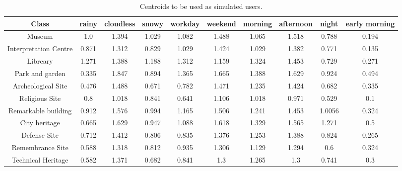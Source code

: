 \begin{table}[h!]
\centering
\caption{Centroids to be used as simulated users.}
\label{table:relevances-experiment}
\begin{tabular}{ |c|c|c|c|c|c|c|c|c|c| } 
    \hline
    \textbf{Class} & \textbf{rainy} & \textbf{cloudless} & \textbf{snowy} & \textbf{workday} & \textbf{weekend} & \textbf{morning} & \textbf{afternoon} & \textbf{night} & \textbf{early morning} \\
    \hline
    \hline

    Museum & 1.0 & 1.394 & 1.029 & 1.082 & 1.488 & 1.065 & 1.518 & 0.788 & 0.194 \\ \hline
    
    Interpretation Centre & 0.871 & 1.312 & 0.829 & 1.029 & 1.424 & 1.029  & 1.382 & 0.771 & 0.135 \\ \hline

    Libreary & 1.271 & 1.388  & 1.188  & 1.312 &1.159 & 1.324 & 1.453 & 0.729  & 0.271 \\ \hline

    Park and garden &
    0.335 & 1.847  & 0.894 & 1.365 & 1.665 & 1.388  & 1.629 & 0.924 & 0.494  \\ \hline

    Archeological Site &
    0.476 & 1.488 & 0.671 & 0.782 & 1.471 & 1.235 & 1.424 & 0.682  & 0.335 \\ \hline

    Religious Site &
    0.8 & 1.018 & 0.841  & 0.641  & 1.106 & 1.018 & 0.971 & 0.529  & 0.1 \\ \hline

    Remarkable building &
    0.912 & 1.576  & 0.994  & 1.165 & 1.506 & 1.241  & 1.453 & 1.0056 & 0.324 \\ \hline
    
    City heritage &
    0.665 & 1.629  & 0.947  & 1.088  & 1.618 & 1.329  & 1.565 & 1.271 & 0.5 \\ \hline
    
    Defense Site &
    0.712 & 1.412 & 0.806 & 0.835  & 1.376  & 1.253 & 1.388  & 0.824 & 0.265 \\ \hline
    
    Remembrance Site &
    0.588  & 1.318 & 0.812 & 0.935  & 1.306 & 1.129  & 1.294  & 0.6 & 0.324 \\ \hline
    
    Technical Heritage &
    0.582  & 1.371 & 0.682  & 0.841  & 1.3 & 1.265 & 1.3 & 0.741  & 0.3 \\ \hline
    

\end{tabular}
\end{table}

